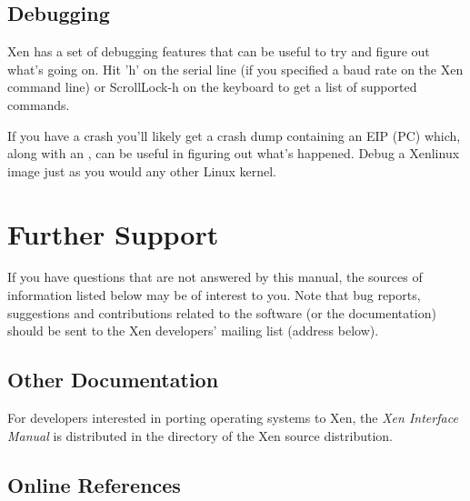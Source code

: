 \documentclass[11pt,twoside,final,openright]{report}
\begin{document}
{\section{Debugging}
\label{s:keys} 

Xen has a set of debugging features that can be useful to try and
figure out what's going on. Hit 'h' on the serial line (if you
specified a baud rate on the Xen command line) or ScrollLock-h on the
keyboard to get a list of supported commands.

If you have a crash you'll likely get a crash dump containing an EIP
(PC) which, along with an , can be useful in
figuring out what's happened.  Debug a Xenlinux image just as you
would any other Linux kernel.





\chapter{Further Support}

If you have questions that are not answered by this manual, the
sources of information listed below may be of interest to you.  Note
that bug reports, suggestions and contributions related to the
software (or the documentation) should be sent to the Xen developers'
mailing list (address below).

\section{Other Documentation}

For developers interested in porting operating systems to Xen, the
{\em Xen Interface Manual} is distributed in the 
directory of the Xen source distribution.  


\section{Online References}

}
\end{document}
